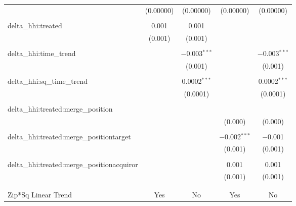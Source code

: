 \begin{table}[H]
{\begin{tabular}{@{\extracolsep{5pt}}lcccc}
   & (0.00000) & (0.00000) & (0.00000) & (0.00000) \\  

   & & & & \\  

  delta\_hhi:treated & 0.001 & 0.001 &  &  \\  

   & (0.001) & (0.001) &  &  \\  

   & & & & \\  

  delta\_hhi:time\_trend &  & $-$0.003$^{***}$ &  & $-$0.003$^{***}$ \\  

   &  & (0.001) &  & (0.001) \\  

   & & & & \\  

  delta\_hhi:sq\_time\_trend &  & 0.0002$^{***}$ &  & 0.0002$^{***}$ \\  

   &  & (0.0001) &  & (0.0001) \\  

   & & & & \\  

  delta\_hhi:treated:merge\_position &  &  &  &  \\  

   &  &  & (0.000) & (0.000) \\  

   & & & & \\  

  delta\_hhi:treated:merge\_positiontarget &  &  & $-$0.002$^{***}$ & $-$0.001 \\  

   &  &  & (0.001) & (0.001) \\  

   & & & & \\  

  delta\_hhi:treated:merge\_positionacquiror &  &  & 0.001 & 0.001 \\  

   &  &  & (0.001) & (0.001) \\  

   & & & & \\  

 \hline \\[-1.8ex]  

 Zip*Sq Linear Trend & Yes & No & Yes & No \\  


\end{tabular}}
\end{table}
